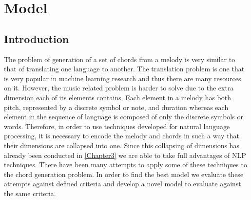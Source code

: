 
\chapter{Model} %
\label{Chapter4} %


\newcommand{\keyword}[1]{\textbf{#1}}
\newcommand{\tabhead}[1]{\textbf{#1}}
\newcommand{\code}[1]{\texttt{#1}}
\newcommand{\file}[1]{\texttt{\bfseries#1}}
\newcommand{\option}[1]{\texttt{\itshape#1}}



\section{Introduction}


The problem of generation of a set of chords from a melody is very similar to that of translating one language to another. 
The translation problem is one that is very popular in machine learning research and thus there are many resources on it.  
However, the music related problem is harder to solve due to the extra dimension each of its elements contains. 
Each element in a melody has both pitch, represented by a discrete symbol or note, and duration whereas each element in the sequence of language is composed of only the discrete symbols or words.  
Therefore, in order to use techniques developed for natural language processing, it is necessary to encode the melody and chords in such a way that their dimensions are collapsed into one. 
Since this collapsing of dimensions has already been conducted in \autoref{Chapter3} we are able to take full advantages of NLP techniques.
There have been many attempts to apply some of these techniques to the chord generation problem. 
In order to find the best model we evaluate these attempts against defined criteria and develop a novel model to evaluate against the same criteria.


